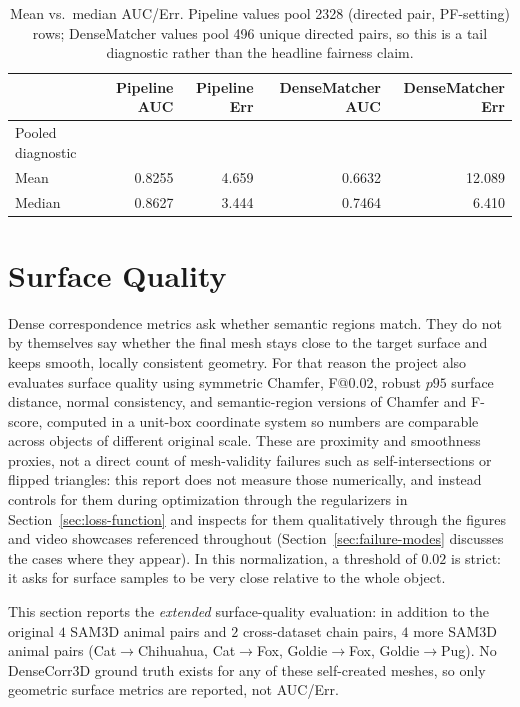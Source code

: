 \documentclass{article}
\makeatletter
\newcommand{\Fscore}{F@0.02}
\makeatother
\begin{document}
\begin{table}[H]
\centering
\small
\begin{tabular}{lrrrr}
\toprule
& Pipeline AUC & Pipeline Err & DenseMatcher AUC & DenseMatcher Err \\
\midrule
Pooled diagnostic & & & & \\
\quad Mean & 0.8255 & 4.659 & 0.6632 & 12.089 \\
\quad Median & 0.8627 & 3.444 & 0.7464 & 6.410 \\
\bottomrule
\end{tabular}
\caption{Mean vs.\ median AUC/Err. Pipeline values pool 2328 (directed pair, PF-setting) rows;
DenseMatcher values pool 496 unique directed pairs, so this is a tail diagnostic rather than the
headline fairness claim.}
\label{tab:mean-median}
\end{table}

\section{Surface Quality}
\label{sec:surface-quality}

Dense correspondence metrics ask whether semantic regions match. They do not by themselves say
whether the final mesh stays close to the target surface and keeps smooth, locally consistent
geometry. For that reason the project also
evaluates surface quality using symmetric Chamfer, \Fscore{}, robust $p95$ surface distance, normal
consistency, and semantic-region versions of Chamfer and F-score, computed in a unit-box
coordinate system so numbers are comparable across objects of different original scale. These are
proximity and smoothness proxies, not a direct count of mesh-validity failures such as
self-intersections or flipped triangles: this report does not measure those numerically, and
instead controls for them during optimization through the regularizers in
Section~\ref{sec:loss-function} and inspects for them qualitatively through the figures and video
showcases referenced throughout (Section~\ref{sec:failure-modes} discusses the cases where they
appear). In this
normalization, a threshold of $0.02$ is strict: it asks for surface samples to be very close
relative to the whole object.

This section reports the \emph{extended} surface-quality evaluation: in
addition to the original $4$ SAM3D animal pairs and $2$ cross-dataset chain pairs, $4$ more SAM3D
animal pairs (Cat$\to$Chihuahua, Cat$\to$Fox, Goldie$\to$Fox, Goldie$\to$Pug). No DenseCorr3D
ground truth exists for any of these self-created meshes, so only geometric surface metrics are
reported, not AUC/Err.
\end{document}
